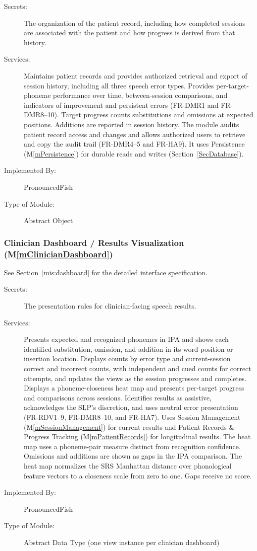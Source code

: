 \documentclass[12pt, titlepage]{article}
\newcommand{\mref}[1]{M\ref{#1}}
\begin{document}
\begin{description}
\item[Secrets:] The organization of the patient record, including
how completed sessions are associated with the patient and how progress is
derived from that history.
\item[Services:] Maintains patient records and provides authorized retrieval and
export of session history, including all three speech error types. Provides
per-target-phoneme performance over time, between-session comparisons,
and indicators of improvement and persistent errors (FR-DMR1 and
FR-DMR8--10). Target progress counts substitutions and omissions at expected
positions. Additions are reported in session history. The module audits
patient record access and changes
and allows authorized users to retrieve and copy the audit trail
(FR-DMR4--5 and FR-HA9). It uses
Persistence (\mref{mPersistence}) for durable reads and writes
(Section~\ref{SecDatabase}).
\item[Implemented By:] PronouncedFish
\item[Type of Module:] Abstract Object
\end{description}

\subsubsection{Clinician Dashboard / Results Visualization (\mref{mClinicianDashboard})}

See Section~\ref{mis:dashboard} for the detailed interface specification.

\begin{description}
\item[Secrets:] The presentation rules for clinician-facing speech results.
\item[Services:] Presents expected and recognized phonemes in IPA and shows
each identified substitution, omission, and addition in its word position or
insertion location. Displays counts by error type and current-session
correct and incorrect counts, with independent and cued counts for correct
attempts, and updates the views as the session progresses and completes.
Displays a phoneme-closeness heat map and presents per-target progress and
comparisons across sessions. Identifies results as assistive, acknowledges
the SLP's discretion, and uses neutral error presentation (FR-RDV1--9,
FR-DMR8--10, and FR-HA7). Uses Session Management
(\mref{mSessionManagement}) for current results and Patient Records \&
Progress Tracking (\mref{mPatientRecords}) for longitudinal results. The
heat map uses a phoneme-pair measure distinct from recognition confidence.
Omissions and additions are shown as gaps in the IPA comparison.
The heat map normalizes the SRS Manhattan distance over phonological feature
vectors to a closeness scale from zero to one. Gaps receive no score.
\item[Implemented By:] PronouncedFish
\item[Type of Module:] Abstract Data Type (one view instance per clinician
dashboard)
\end{description}
\end{document}
